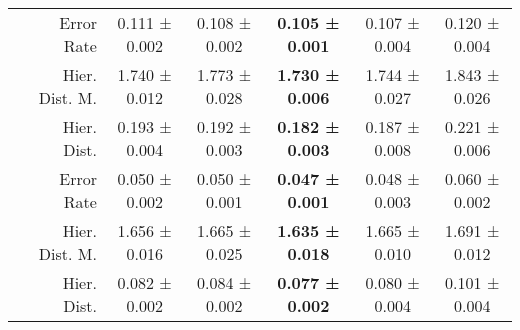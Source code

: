 \begin{tabularx}{\linewidth}{X r *{5}{c}}
\hhline{-------}
\multirow[c]{3}{*}{2} & Error Rate & {\cellcolor[HTML]{BAE3B3}} \color[HTML]{000000} 0.111 \mdseries ± 0.002 & {\cellcolor[HTML]{9ED798}} \color[HTML]{000000} 0.108 \mdseries ± 0.002 & {\cellcolor[HTML]{75C477}} \color[HTML]{000000} \bfseries 0.105 \mdseries ± 0.001 & {\cellcolor[HTML]{8DD08A}} \color[HTML]{000000} 0.107 \mdseries ± 0.004 & {\cellcolor[HTML]{F7FCF5}} \color[HTML]{000000} 0.120 \mdseries ± 0.004 \\
 & Hier. Dist. M. & {\cellcolor[HTML]{84CC83}} \color[HTML]{000000} 1.740 \mdseries ± 0.012 & {\cellcolor[HTML]{B5E1AE}} \color[HTML]{000000} 1.773 \mdseries ± 0.028 & {\cellcolor[HTML]{75C477}} \color[HTML]{000000} \bfseries 1.730 \mdseries ± 0.006 & {\cellcolor[HTML]{8BCF89}} \color[HTML]{000000} 1.744 \mdseries ± 0.027 & {\cellcolor[HTML]{F7FCF5}} \color[HTML]{000000} 1.843 \mdseries ± 0.026 \\
 & Hier. Dist. & {\cellcolor[HTML]{A8DCA2}} \color[HTML]{000000} 0.193 \mdseries ± 0.004 & {\cellcolor[HTML]{A4DA9E}} \color[HTML]{000000} 0.192 \mdseries ± 0.003 & {\cellcolor[HTML]{75C477}} \color[HTML]{000000} \bfseries 0.182 \mdseries ± 0.003 & {\cellcolor[HTML]{8BCF89}} \color[HTML]{000000} 0.187 \mdseries ± 0.008 & {\cellcolor[HTML]{F7FCF5}} \color[HTML]{000000} 0.221 \mdseries ± 0.006 \\
\hhline{-------}
\multirow[c]{3}{*}{3} & Error Rate & {\cellcolor[HTML]{9BD696}} \color[HTML]{000000} 0.050 \mdseries ± 0.002 & {\cellcolor[HTML]{A3DA9D}} \color[HTML]{000000} 0.050 \mdseries ± 0.001 & {\cellcolor[HTML]{75C477}} \color[HTML]{000000} \bfseries 0.047 \mdseries ± 0.001 & {\cellcolor[HTML]{81CA81}} \color[HTML]{000000} 0.048 \mdseries ± 0.003 & {\cellcolor[HTML]{F7FCF5}} \color[HTML]{000000} 0.060 \mdseries ± 0.002 \\
 & Hier. Dist. M. & {\cellcolor[HTML]{B5E1AE}} \color[HTML]{000000} 1.656 \mdseries ± 0.016 & {\cellcolor[HTML]{CCEBC6}} \color[HTML]{000000} 1.665 \mdseries ± 0.025 & {\cellcolor[HTML]{75C477}} \color[HTML]{000000} \bfseries 1.635 \mdseries ± 0.018 & {\cellcolor[HTML]{CCEBC6}} \color[HTML]{000000} 1.665 \mdseries ± 0.010 & {\cellcolor[HTML]{F7FCF5}} \color[HTML]{000000} 1.691 \mdseries ± 0.012 \\
 & Hier. Dist. & {\cellcolor[HTML]{9CD797}} \color[HTML]{000000} 0.082 \mdseries ± 0.002 & {\cellcolor[HTML]{A8DCA2}} \color[HTML]{000000} 0.084 \mdseries ± 0.002 & {\cellcolor[HTML]{75C477}} \color[HTML]{000000} \bfseries 0.077 \mdseries ± 0.002 & {\cellcolor[HTML]{8ACE88}} \color[HTML]{000000} 0.080 \mdseries ± 0.004 & {\cellcolor[HTML]{F7FCF5}} \color[HTML]{000000} 0.101 \mdseries ± 0.004 \\

\bottomrule
\end{tabularx}